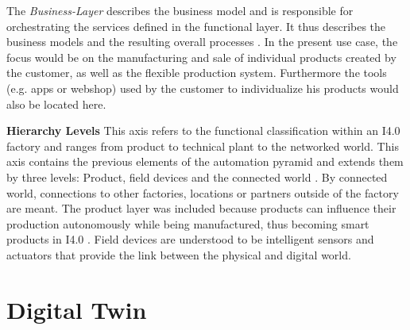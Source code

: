 The \textit{Business-Layer} describes the business model and is responsible for orchestrating the services defined in the functional layer. It thus describes the business models and the resulting overall processes \cite[p. 53]{Heidel2017ReferenzarchitekturmodellIndustrie4.0Komponente}. In the present use case, the focus would be on the manufacturing and sale of individual products created by the customer, as well as the flexible production system. Furthermore the tools (e.g. apps or webshop) used by the customer to individualize his products would also be located here.
    
\textbf{Hierarchy Levels} This axis refers to the functional classification within an \ac{I4.0} factory and ranges from product to technical plant to the networked world. This axis contains the previous elements of the automation pyramid and extends them by three levels: Product, field devices and the connected world \cite[p. 44]{Heidel2017ReferenzarchitekturmodellIndustrie4.0Komponente}. By connected world, connections to other factories, locations or partners outside of the factory are meant. The product layer was included because products can influence their production autonomously while being manufactured, thus becoming smart products in \ac{I4.0} \cite[p. 21]{Acatech2013Recommendations4.0}. Field devices are understood to be intelligent sensors and actuators that provide the link between the physical and digital world.  

\section{Digital Twin}





